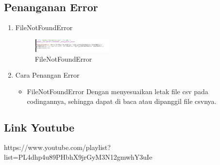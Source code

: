 \subsection{Penanganan Error}
\begin{enumerate}
	\item FileNotFoundError
	\begin{figure}[H]
		\includegraphics[width=4cm]{figures/1174067/4/error1.jpg}
		\centering
		\caption{FileNotFoundError}
	\end{figure}
	\item Cara Penangan Error
	\begin{itemize}
		\item FileNotFoundError
		\hfill\break
		Dengan menyesuaikan letak file csv pada codingannya, sehingga dapat  di baca atau dipanggil file csvnya.
	\end{itemize}
\end{enumerate}

\subsection{Link Youtube}
https://www.youtube.com/playlist?list=PL4dhp4u89PHbhX9jrGyM3N12gmwhY3uIe